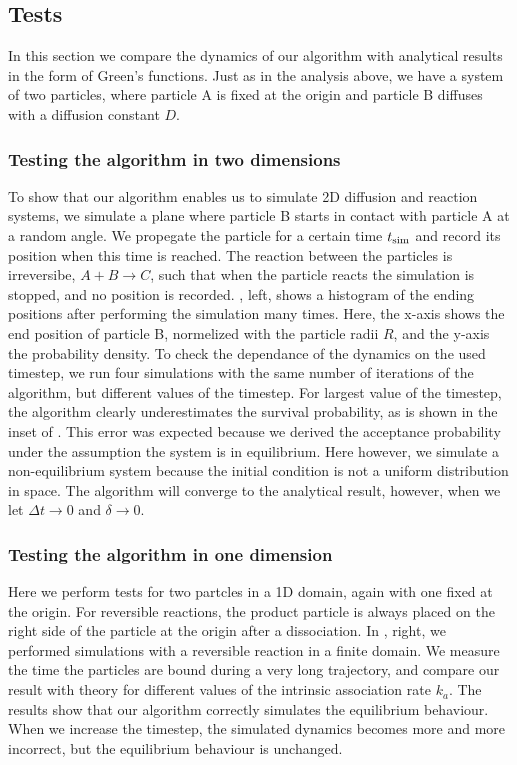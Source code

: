 \subsection{Tests}
In this section we compare the dynamics of our algorithm with analytical results in the form of Green's functions. Just as in the analysis above, we have a system of two particles, where particle A is fixed at the origin and particle B diffuses with a diffusion constant $D$. 

\subsubsection{Testing the algorithm in two dimensions}
To show that our algorithm enables us to simulate 2D diffusion and reaction systems, we simulate a plane where particle B starts in contact with particle A at a random angle. We propegate the particle for a certain time $t_{\rm sim}$ and record its position when this time is reached. The reaction between the particles is irreversibe, $A + B \to C$, such that when the particle reacts the simulation is stopped, and no position is recorded. , left, shows a histogram of the ending positions after performing the simulation many times. Here, the x-axis shows the end position of particle B, normelized with the particle radii $R$, and the y-axis the probability density. To check the dependance of the dynamics on the used timestep, we run four simulations with the same number of iterations of the algorithm, but different values of the timestep. For largest value of the timestep, the algorithm clearly underestimates the survival probability, as is shown in the inset of . This error was expected because we derived the acceptance probability under the assumption the system is in equilibrium. Here however, we simulate a non-equilibrium system because the initial condition is not a uniform distribution in space. The algorithm will converge to the analytical result, however, when we let $\Delta t \to 0$ and $\delta \to 0$.

\subsubsection{Testing the algorithm in one dimension}
Here we perform tests for two partcles in a 1D domain, again with one fixed at the origin. For reversible reactions, the product particle is always placed on the right side of the particle at the origin after a dissociation. In , right, we performed simulations with a reversible reaction in a finite domain. We measure the time the particles are bound during a very long trajectory, and compare our result with theory for different values of the intrinsic association rate $k_a$. The results show that our algorithm correctly simulates the equilibrium behaviour. When we increase the timestep, the simulated dynamics becomes more and more incorrect, but the equilibrium behaviour is unchanged.

